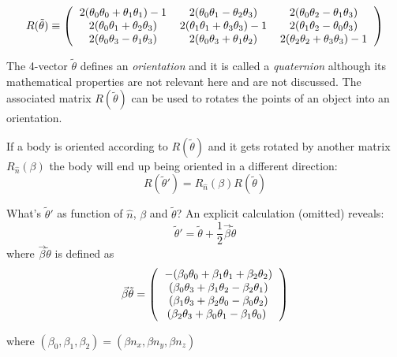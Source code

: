 \documentclass[12pt]{article}
\begin{document}
\begin{equation}
R(\tilde \theta) \equiv \left(\begin{tabular}{ccc}
$2(\theta_0 \theta_0 + \theta_1 \theta_1)-1$ & $2(\theta_0 \theta_1 - \theta_2 \theta_3)$ & $2(\theta_0 \theta_2 - \theta_1 \theta_3) $\\
$2(\theta_0 \theta_1 + \theta_2 \theta_3)$ & $2(\theta_1 \theta_1 +\theta_3 \theta_3)-1$ & $2(\theta_1 \theta_2-\theta_0 \theta_3) $\\
$2(\theta_0 \theta_3 - \theta_1 \theta_3)$ & $2(\theta_0 \theta_3 + \theta_1 \theta_2)$ & $2(\theta_2 \theta_2 + \theta_3 \theta_3)-1$
\end{tabular}\right)
\label{rotation}
\end{equation}

The 4-vector $\tilde \theta$ defines an {\it orientation} and it is called a {\it quaternion} although its mathematical properties are not relevant here and are not discussed. The associated matrix $R(\tilde \theta)$ can be used to rotates the points of an object into an orientation.

If a body is oriented according to $R(\tilde \theta)$ and it gets rotated by another matrix $R_{\hat n}(\beta)$ the body will end up being oriented in a different direction:
\begin{equation}
R(\tilde \theta') = R_{\hat n}(\beta) R(\tilde \theta)
\end{equation}

What's  $\tilde \theta'$ as function of $\hat n$, $\beta$ and $\tilde \theta$?
An explicit calculation (omitted) reveals:
\begin{equation}
\tilde \theta' = \tilde \theta + \frac{1}{2}\vec \beta \tilde \theta
\label{theta_update}
\end{equation}
where $\vec \beta \tilde \theta$ is defined as 
\begin{equation}
\vec \beta \tilde \theta = \left(\begin{tabular}{c}
$- (\beta_0 \theta_0 + \beta_1 \theta_1 + \beta_2 \theta_2)$ \\
$(\beta_0 \theta_3 + \beta_1 \theta_2 - \beta_2 \theta_1)$ \\ 
$(\beta_1 \theta_3 + \beta_2 \theta_0 - \beta_0 \theta_2)$ \\ 
$(\beta_2 \theta_3 + \beta_0 \theta_1 - \beta_1 \theta_0)$ 
\label{vxq}
\end{tabular}\right)
\end{equation}

where $(\beta_0,\beta_1,\beta_2)=(\beta n_x,\beta n_y,\beta n_z)$
\end{document}
